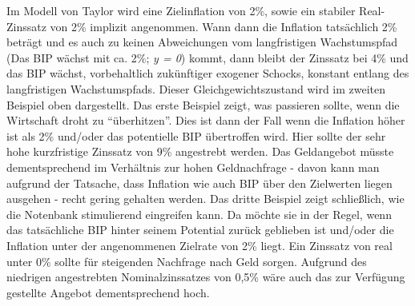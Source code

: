Im Modell von Taylor wird eine Zielinflation von 2\%, sowie ein stabiler Real-Zinssatz von 2\% implizit angenommen. 
Wann dann die Inflation tatsächlich 2\% beträgt und es auch zu keinen Abweichungen vom langfristigen Wachstumspfad (Das BIP wächst mit ca. 2\%; \textit{y = 0}) kommt, dann bleibt der Zinssatz bei 4\% und das BIP wächst, vorbehaltlich zukünftiger exogener Schocks, konstant entlang des langfristigen Wachstumspfads. Dieser Gleichgewichtszustand wird im zweiten Beispiel oben dargestellt.
Das erste Beispiel zeigt, was passieren sollte, wenn die Wirtschaft droht zu "`überhitzen"'. Dies ist dann der Fall wenn die Inflation höher ist als 2\% und/oder das potentielle BIP übertroffen wird. Hier sollte der sehr hohe kurzfristige Zinssatz von 9\% angestrebt werden. Das Geldangebot müsste dementsprechend im Verhältnis zur hohen Geldnachfrage - davon kann man aufgrund der Tatsache, dass Inflation wie auch BIP über den Zielwerten liegen ausgehen - recht gering gehalten werden.
Das dritte Beispiel zeigt schließlich, wie die Notenbank stimulierend eingreifen kann. Da möchte sie in der Regel, wenn das tatsächliche BIP hinter seinem Potential zurück geblieben ist und/oder die Inflation unter der angenommenen Zielrate von 2\% liegt. Ein Zinssatz von real unter 0\% sollte für steigenden Nachfrage nach Geld sorgen. Aufgrund des niedrigen angestrebten Nominalzinssatzes von 0,5\% wäre auch das zur Verfügung gestellte Angebot dementsprechend hoch.

